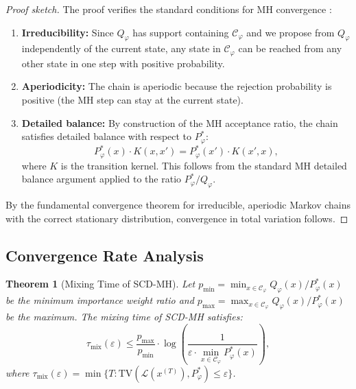 \documentclass[twoside,11pt]{article}
\newtheorem{theorem}{Theorem}[section]
\newcommand{\Constraint}{\mathcal{C}}
\newcommand{\TV}{\mathrm{TV}}
\begin{document}
\begin{proof}[Proof sketch]
The proof verifies the standard conditions for MH convergence
\citep{tierney1994markov, roberts2004general}:
\begin{enumerate}
    \item \textbf{Irreducibility:} Since $Q_\varphi$ has support containing
    $\Constraint_\varphi$ and we propose from $Q_\varphi$ independently of
    the current state, any state in $\Constraint_\varphi$ can be reached
    from any other state in one step with positive probability.

    \item \textbf{Aperiodicity:} The chain is aperiodic because the
    rejection probability is positive (the MH step can stay at the current
    state).

    \item \textbf{Detailed balance:} By construction of the MH acceptance
    ratio, the chain satisfies detailed balance with respect to
    $P^*_\varphi$:
    \[
    P^*_\varphi(x) \cdot K(x, x') = P^*_\varphi(x') \cdot K(x', x),
    \]
    where $K$ is the transition kernel. This follows from the standard
    MH detailed balance argument applied to the ratio
    $P^*_\varphi / Q_\varphi$.
\end{enumerate}
By the fundamental convergence theorem for irreducible, aperiodic Markov
chains with the correct stationary distribution, convergence in total
variation follows.
\end{proof}

\subsection{Convergence Rate Analysis}
\label{sec:convergence-rate}

\begin{theorem}[Mixing Time of SCD-MH]
\label{thm:mixing-time}
Let $p_{\min} = \min_{x \in \Constraint_\varphi} Q_\varphi(x) / P^*_\varphi(x)$
be the minimum importance weight ratio and
$p_{\max} = \max_{x \in \Constraint_\varphi} Q_\varphi(x) / P^*_\varphi(x)$
be the maximum. The mixing time of SCD-MH satisfies:
\begin{equation}
\label{eq:mixing-time}
\tau_{\mathrm{mix}}(\varepsilon) \leq
\frac{p_{\max}}{p_{\min}} \cdot \log\!\left(\frac{1}{\varepsilon \cdot
\min_{x \in \Constraint_\varphi} P^*_\varphi(x)}\right),
\end{equation}
where $\tau_{\mathrm{mix}}(\varepsilon) = \min\{T :
\TV(\mathcal{L}(x^{(T)}), P^*_\varphi) \leq \varepsilon\}$.
\end{theorem}
\end{document}
